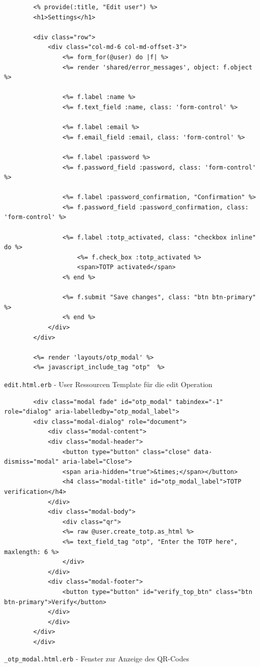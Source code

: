 \documentclass[11pt,a4paper,ngerman]{scrreprt}
\begin{document}
\begin{listing}[htpb]
    \begin{verbatim}
        <% provide(:title, "Edit user") %>
        <h1>Settings</h1>

        <div class="row">
            <div class="col-md-6 col-md-offset-3">
                <%= form_for(@user) do |f| %>
                <%= render 'shared/error_messages', object: f.object %>

                <%= f.label :name %>
                <%= f.text_field :name, class: 'form-control' %>

                <%= f.label :email %>
                <%= f.email_field :email, class: 'form-control' %>

                <%= f.label :password %>
                <%= f.password_field :password, class: 'form-control' %>

                <%= f.label :password_confirmation, "Confirmation" %>
                <%= f.password_field :password_confirmation, class: 'form-control' %>

                <%= f.label :totp_activated, class: "checkbox inline" do %>
                    <%= f.check_box :totp_activated %>
                    <span>TOTP activated</span>
                <% end %>

                <%= f.submit "Save changes", class: "btn btn-primary" %>
                <% end %>
            </div>
        </div>

        <%= render 'layouts/otp_modal' %>
        <%= javascript_include_tag "otp"  %>
    \end{verbatim}
    \caption{\texttt{edit.html.erb} - User Ressourcen Template für die edit Operation}
    \label{lst:edit.html.erb}
\end{listing}
\begin{listing}[htpb]
    \begin{verbatim}
        <div class="modal fade" id="otp_modal" tabindex="-1" role="dialog" aria-labelledby="otp_modal_label">
        <div class="modal-dialog" role="document">
            <div class="modal-content">
            <div class="modal-header">
                <button type="button" class="close" data-dismiss="modal" aria-label="Close">
                <span aria-hidden="true">&times;</span></button>
                <h4 class="modal-title" id="otp_modal_label">TOTP verification</h4>
            </div>
            <div class="modal-body">
                <div class="qr">
                <%= raw @user.create_totp.as_html %>
                <%= text_field_tag "otp", "Enter the TOTP here", maxlength: 6 %>
                </div>
            </div>
            <div class="modal-footer">
                <button type="button" id="verify_top_btn" class="btn btn-primary">Verify</button>
            </div>
            </div>
        </div>
        </div>
    \end{verbatim}
    \caption{\texttt{\_otp\_modal.html.erb} - Fenster zur Anzeige des QR-Codes}
    \label{lst:otp_modal.html.erb}
\end{listing}
\end{document}
